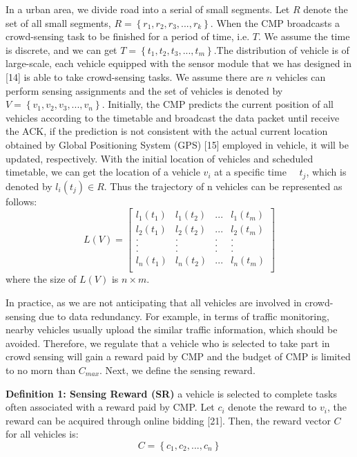\documentclass[journal]{IEEEtran}
\begin{document}
In a urban area, we divide road into a serial of small segments. Let $R$ denote the set of all small segments, $R=\left \{ r_{1},r_{2},r_{3},...,r_{k} \right \}$. When the CMP broadcasts a crowd-sensing task to be finished for a period of time, i.e. $T$. We assume the time is discrete, and we can get $T=\left \{ t_{1},t_{2},t_{3},...,t_{m} \right \}$.The distribution of vehicle is of large-scale, each vehicle equipped with the sensor module that we has designed in [14] is able to take crowd-sensing tasks. We assume there are $n$ vehicles can perform sensing assignments and the set of vehicles is denoted by $V=\left \{ v_{1},v_{2},v_{3},...,v_{n}\right \}$. Initially, the CMP predicts the current position of all vehicles according to the timetable and broadcast the data packet until receive the ACK, if the prediction is not consistent with the actual current location obtained by Global Positioning System (GPS) [15] employed in vehicle, it will be updated, respectively.  With the initial location of vehicles and scheduled timetable, we can get the location of a vehicle $v_{i}$ at a specific time　 $t_{j}$, which is denoted by  $l_{i}(t_{j})\in R$. Thus the trajectory of n vehicles can be represented as follows:
\setcounter{equation}{0}
\begin{equation}
L(V)=\begin{bmatrix}
l_{1}(t_{1})&l_{1}(t_{2})&... & l_{1}(t_{m})\\ 
l_{2}(t_{1})&l_{2}(t_{2})&... & l_{2}(t_{m})\\
.&. &.&.\\ 
.&. &.&.\\
.&. &.&.\\
l_{n}(t_{1})&l_{n}(t_{2})&... & l_{n}(t_{m})\\
\end{bmatrix}
\end{equation}
where the size of $L(V)$ is $n\times m$.


In practice, as we are not anticipating that all vehicles are involved in crowd-sensing due to data redundancy. For example, in terms of traffic monitoring, nearby vehicles usually upload the similar traffic information, which should be avoided. Therefore, we regulate that a vehicle who is selected to take part in crowd sensing will gain a reward paid by CMP and the budget of CMP is limited to no morn than $C_{max}$. Next, we define the sensing reward.

\noindent
\textbf{Definition 1: Sensing Reward (SR)} a vehicle is selected to complete tasks often associated with a reward paid by CMP. Let $c_{i}$ denote the reward to $v_{i}$, the reward can be acquired through online bidding [21]. Then, the reward vector $C$ for all vehicles is:
\begin{equation}
C=\left \{c_{1},c_{2},...,c_{n} \right \}
\end{equation}
\end{document}
